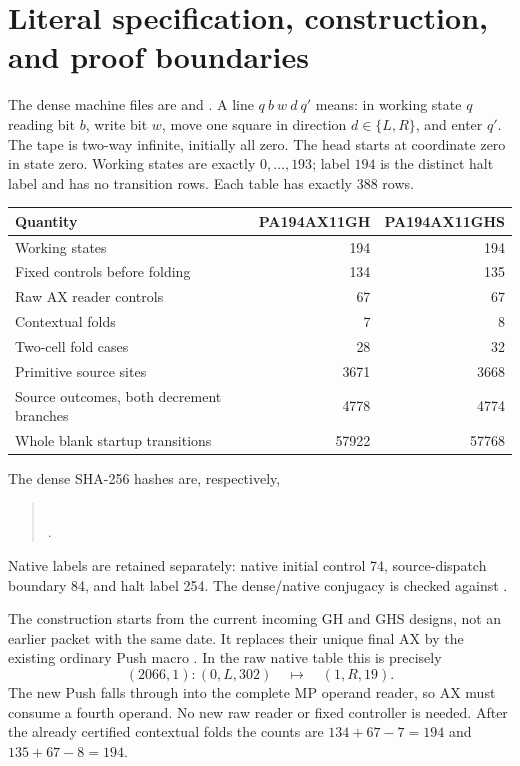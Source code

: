 \section{Literal specification, construction, and proof boundaries}

The dense machine files are 
and . A line
$q\ b\ w\ d\ q'$ means: in working state $q$ reading bit $b$, write
bit $w$, move one square in direction $d\in\{L,R\}$, and enter $q'$.
The tape is two-way infinite, initially all zero. The head starts at
coordinate zero in state zero. Working states are exactly
$0,\ldots,193$; label $194$ is the distinct halt label and has no
transition rows. Each table has exactly 388 rows.

\begin{center}\small
\begin{tabular}{lrr}
\toprule
Quantity&PA194AX11GH&PA194AX11GHS\\
\midrule
Working states&194&194\\
Fixed controls before folding&134&135\\
Raw AX reader controls&67&67\\
Contextual folds&7&8\\
Two-cell fold cases&28&32\\
Primitive source sites&3671&3668\\
Source outcomes, both decrement branches&4778&4774\\
Whole blank startup transitions&57922&57768\\
\bottomrule
\end{tabular}
\end{center}

The dense SHA-256 hashes are, respectively,
\begin{quote}\small
{}\\
.
\end{quote}
Native labels are retained separately: native initial control 74,
source-dispatch boundary 84, and halt label 254. The dense/native
conjugacy is checked against .

The construction starts from the current incoming GH and GHS designs,
not an earlier packet with the same date. It replaces their unique final
AX  by the existing ordinary Push macro
. In the raw native table this is precisely
\[
 (2066,1):(0,L,302)\quad\longmapsto\quad(1,R,19).
\]
The new Push falls through into the complete MP operand reader, so AX
must consume a fourth operand. No new raw reader or fixed controller is
needed. After the already certified contextual folds the counts are
$134+67-7=194$ and $135+67-8=194$.

